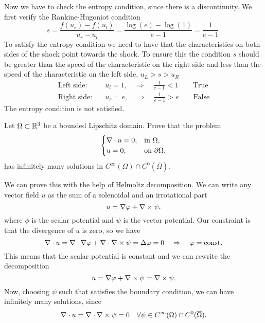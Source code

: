 \begin{itemize}
\begin{enumerate}
        Now we have to check the entropy condition, since there is a discontinuity. We first verify the Rankine-Hugoniot condition
        \[
            s = \frac{f(u_r) - f(u_l)}{u_r - u_l} = \frac{\log(e) - \log(1)}{e - 1} = \frac{1}{e-1}.
        \]
        To satisfy the entropy condition we need to have that the characteristics on both sides of the shock point towards the shock. To ensure this the condition \(s\) should be greater than the speed of the characteristic on the right side and less than the speed of the characteristic on the left side, \(u_L > s > u_R\) 
        \[
            \begin{aligned}
                \text{Left side:} \quad & u_l = 1,  \quad \Rightarrow \quad \frac{1}{e-1} < 1 \qquad \text{True} \\
                \text{Right side:} \quad & u_r = e,  \quad \Rightarrow \quad \frac{1}{e-1} > e \qquad \text{False}
            \end{aligned}
        \]
        The entropy condition is not satisfied.
    \end{enumerate}
\end{itemize}

\newpage
\begin{exercise}
    Let \(\Omega \subset \mathbb{R}^3\) be a bounded Lipschitz domain. Prove that the problem
    \begin{equation*}
        \begin{cases}
            \nabla \cdot u = 0, & \text{in } \Omega, \\
            u  = 0, & \text{on } \partial \Omega,
        \end{cases}
    \end{equation*}
    has infinitely many solutions in \(C^\infty(\Omega) \cap C^0(\overline{\Omega})\).
\end{exercise}
We can prove this with the help of Helmoltz decomposition. We can write any vector field \(u\) as the sum of a solenoidal and an irrotational part
\[
    u = \nabla \varphi + \nabla \times \psi.
\]
where \(\phi\) is the scalar potential and \(\psi\) is the vector potential. Our constraint is that the divergence of \(u\) is zero, so we have
\[
    \nabla \cdot u = \nabla \cdot \nabla \varphi + \nabla \cdot \nabla \times \psi = \Delta \varphi = 0 \quad \Rightarrow \quad \varphi = \text{const.}
\]
This means that the scalar potential is constant and we can rewrite the decomposition
\[
    u = \nabla \varphi + \nabla \times \psi = \nabla \times \psi.
\]
Now, choosing \(\psi\) such that satisfies the boundary condition, we can have infinitely many solutions, since 
\[
    \nabla \cdot u = \nabla \cdot \nabla \times \psi = 0 \quad \forall \psi \in C^\infty(\Omega) \cap C^0(\overline{\Omega}).
\]

